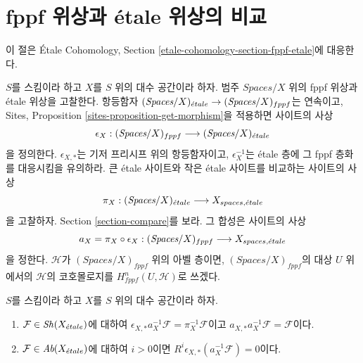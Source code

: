 \section{fppf 위상과 \'etale 위상의 비교}
\label{section-fppf-etale}

\noindent
이 절은 \'Etale Cohomology, Section
\ref{etale-cohomology-section-fppf-etale}에 대응한다.

\medskip\noindent
$S$를 스킴이라 하고 $X$를 $S$ 위의 대수 공간이라 하자.
범주 $\textit{Spaces}/X$ 위의 fppf 위상과 \'etale 위상을 고찰한다.
항등함자
$(\textit{Spaces}/X)_{\acute{e}tale} \to (\textit{Spaces}/X)_{fppf}$는
연속이고, Sites, Proposition \ref{sites-proposition-get-morphism}을
적용하면 사이트의 사상
$$
\epsilon_X :
(\textit{Spaces}/X)_{fppf} \longrightarrow (\textit{Spaces}/X)_{\acute{e}tale}
$$
을 정의한다. $\epsilon_{X, *}$는 기저 프리시프 위의 항등함자이고,
$\epsilon_X^{-1}$는 \'etale 층에 그 fppf 층화를 대응시킴을 유의하라.
큰 \'etale 사이트와 작은 \'etale 사이트를 비교하는 사이트의 사상
$$
\pi_X : (\textit{Spaces}/X)_{\acute{e}tale} \longrightarrow X_{spaces, {\acute{e}tale}}
$$
을 고찰하자. Section \ref{section-compare}를 보라.
그 합성은 사이트의 사상
$$
a_X = \pi_X \circ \epsilon_X :
(\textit{Spaces}/X)_{fppf}
\longrightarrow
X_{spaces, {\acute{e}tale}}
$$
을 정한다. $\mathcal{H}$가 $(\textit{Spaces}/X)_{fppf}$ 위의 아벨
층이면, $(\textit{Spaces}/X)_{fppf}$의 대상 $U$ 위에서의
$\mathcal{H}$의 코호몰로지를 $H^n_{fppf}(U, \mathcal{H})$로 쓰겠다.

\begin{lemma}
\label{lemma-comparison-fppf-etale}
$S$를 스킴이라 하고 $X$를 $S$ 위의 대수 공간이라 하자.
\begin{enumerate}
\item $\mathcal{F} \in \mathop{\mathit{Sh}}\nolimits(X_{\acute{e}tale})$에 대하여
$\epsilon_{X, *}a_X^{-1}\mathcal{F} = \pi_X^{-1}\mathcal{F}$이고
$a_{X, *}a_X^{-1}\mathcal{F} = \mathcal{F}$이다.
\item $\mathcal{F} \in \textit{Ab}(X_{\acute{e}tale})$에 대하여
$i > 0$이면 $R^i\epsilon_{X, *}(a_X^{-1}\mathcal{F}) = 0$이다.
\end{enumerate}
\end{lemma}

